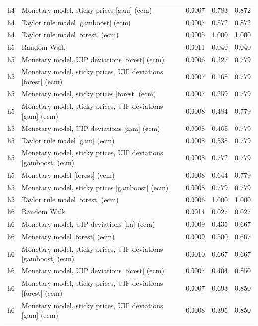 \begin{ThreePartTable}
\begin{longtable}[t]{cp{5.5cm}ccc}
h4 & \raggedright Monetary model, sticky prices [gam] (ecm) & 0.0007 & 0.783 & 0.872\\
h4 & \raggedright Taylor rule model [gamboost] (ecm) & 0.0007 & 0.872 & 0.872\\
h4 & \raggedright Taylor rule model [forest] (ecm) & 0.0005 & 1.000 & 1.000\\
\addlinespace
h5 & \raggedright Random Walk & 0.0011 & 0.040 & 0.040\\
h5 & \raggedright Monetary model, UIP deviations [forest] (ecm) & 0.0006 & 0.327 & 0.779\\
h5 & \raggedright Monetary model, sticky prices, UIP deviations [forest] (ecm) & 0.0007 & 0.168 & 0.779\\
h5 & \raggedright Monetary model, sticky prices [forest] (ecm) & 0.0007 & 0.259 & 0.779\\
h5 & \raggedright Monetary model, sticky prices, UIP deviations [gam] (ecm) & 0.0008 & 0.484 & 0.779\\
h5 & \raggedright Monetary model, UIP deviations [gam] (ecm) & 0.0008 & 0.465 & 0.779\\
h5 & \raggedright Taylor rule model [gam] (ecm) & 0.0008 & 0.538 & 0.779\\
h5 & \raggedright Monetary model, sticky prices, UIP deviations [gamboost] (ecm) & 0.0008 & 0.772 & 0.779\\
h5 & \raggedright Monetary model [forest] (ecm) & 0.0008 & 0.644 & 0.779\\
h5 & \raggedright Monetary model, sticky prices [gamboost] (ecm) & 0.0008 & 0.779 & 0.779\\
h5 & \raggedright Taylor rule model [forest] (ecm) & 0.0006 & 1.000 & 1.000\\
\addlinespace
h6 & \raggedright Random Walk & 0.0014 & 0.027 & 0.027\\
h6 & \raggedright Monetary model, UIP deviations [lm] (ecm) & 0.0009 & 0.435 & 0.667\\
h6 & \raggedright Monetary model [forest] (ecm) & 0.0009 & 0.500 & 0.667\\
h6 & \raggedright Monetary model, sticky prices, UIP deviations [gamboost] (ecm) & 0.0010 & 0.667 & 0.667\\
h6 & \raggedright Monetary model, UIP deviations [forest] (ecm) & 0.0007 & 0.404 & 0.850\\
h6 & \raggedright Monetary model, sticky prices, UIP deviations [forest] (ecm) & 0.0007 & 0.693 & 0.850\\
h6 & \raggedright Monetary model, sticky prices, UIP deviations [gam] (ecm) & 0.0008 & 0.395 & 0.850\\

\end{longtable}
\end{ThreePartTable}
